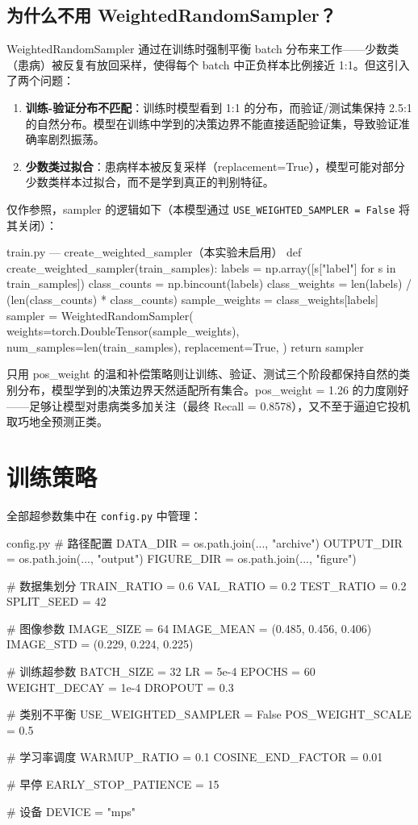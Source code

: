 \documentclass[12pt,a4paper]{ctexart}
\begin{document}
\subsection{为什么不用 WeightedRandomSampler？}

WeightedRandomSampler 通过在训练时强制平衡 batch 分布来工作——少数类（患病）被反复有放回采样，使得每个 batch 中正负样本比例接近 1:1。但这引入了两个问题：

\begin{enumerate}
\item \textbf{训练-验证分布不匹配}：训练时模型看到 1:1 的分布，而验证/测试集保持 2.5:1 的自然分布。模型在训练中学到的决策边界不能直接适配验证集，导致验证准确率剧烈振荡。
\item \textbf{少数类过拟合}：患病样本被反复采样（replacement=True），模型可能对部分少数类样本过拟合，而不是学到真正的判别特征。
\end{enumerate}

仅作参照，sampler 的逻辑如下（本模型通过 \texttt{USE\_WEIGHTED\_SAMPLER = False} 将其关闭）：

\begin{pythoncode}{train.py — create\_weighted\_sampler（本实验未启用）}
def create_weighted_sampler(train_samples):
    labels = np.array([s["label"] for s in train_samples])
    class_counts = np.bincount(labels)
    class_weights = len(labels) / (len(class_counts) * class_counts)
    sample_weights = class_weights[labels]
    sampler = WeightedRandomSampler(
        weights=torch.DoubleTensor(sample_weights),
        num_samples=len(train_samples), replacement=True,
    )
    return sampler
\end{pythoncode}

只用 pos\_weight 的温和补偿策略则让训练、验证、测试三个阶段都保持自然的类别分布，模型学到的决策边界天然适配所有集合。pos\_weight = 1.26 的力度刚好——足够让模型对患病类多加关注（最终 Recall = 0.8578），又不至于逼迫它投机取巧地全预测正类。

\section{训练策略}

全部超参数集中在 \texttt{config.py} 中管理：

\begin{pythoncode}{config.py}
# 路径配置
DATA_DIR   = os.path.join(..., "archive")
OUTPUT_DIR = os.path.join(..., "output")
FIGURE_DIR = os.path.join(..., "figure")

# 数据集划分
TRAIN_RATIO = 0.6
VAL_RATIO   = 0.2
TEST_RATIO  = 0.2
SPLIT_SEED  = 42

# 图像参数
IMAGE_SIZE = 64
IMAGE_MEAN = (0.485, 0.456, 0.406)
IMAGE_STD  = (0.229, 0.224, 0.225)

# 训练超参数
BATCH_SIZE   = 32
LR           = 5e-4
EPOCHS       = 60
WEIGHT_DECAY = 1e-4
DROPOUT      = 0.3

# 类别不平衡
USE_WEIGHTED_SAMPLER = False
POS_WEIGHT_SCALE = 0.5

# 学习率调度
WARMUP_RATIO = 0.1
COSINE_END_FACTOR = 0.01

# 早停
EARLY_STOP_PATIENCE = 15

# 设备
DEVICE = "mps"
\end{pythoncode}
\end{document}
